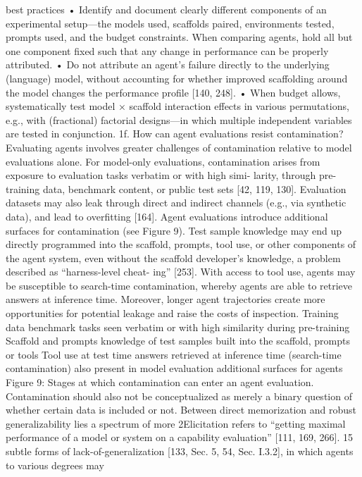 best practices
• Identify and document clearly different components of an experimental setup—the models used, scaffolds
paired, environments tested, prompts used, and the budget constraints. When comparing agents, hold all
but one component fixed such that any change in performance can be properly attributed.
• Do not attribute an agent’s failure directly to the underlying (language) model, without accounting for
whether improved scaffolding around the model changes the performance profile [140, 248].
• When budget allows, systematically test model × scaffold interaction effects in various permutations, e.g.,
with (fractional) factorial designs—in which multiple independent variables are tested in conjunction.
1f. How can agent evaluations resist contamination?
Evaluating agents involves greater challenges of contamination relative to model evaluations alone. For
model-only evaluations, contamination arises from exposure to evaluation tasks verbatim or with high simi-
larity, through pre-training data, benchmark content, or public test sets [42, 119, 130]. Evaluation datasets
may also leak through direct and indirect channels (e.g., via synthetic data), and lead to overfitting [164].
Agent evaluations introduce additional surfaces for contamination (see Figure 9). Test sample knowledge
may end up directly programmed into the scaffold, prompts, tool use, or other components of the agent
system, even without the scaffold developer’s knowledge, a problem described as “harness-level cheat-
ing” [253]. With access to tool use, agents may be susceptible to search-time contamination, whereby agents
are able to retrieve answers at inference time. Moreover, longer agent trajectories create more opportunities
for potential leakage and raise the costs of inspection.
Training data
benchmark tasks seen
verbatim or with high
similarity during pre-training
Scaffold and prompts
knowledge of test samples
built into the scaffold,
prompts or tools
Tool use at test time
answers retrieved at inference
time (search-time
contamination)
also present in model evaluation
additional surfaces for agents
Figure 9: Stages at which contamination can enter an agent evaluation.
Contamination should also not be conceptualized as merely a binary question of whether certain data
is included or not. Between direct memorization and robust generalizability lies a spectrum of more
2Elicitation refers to “getting maximal performance of a model or system on a capability evaluation” [111, 169, 266].
15
subtle forms of lack-of-generalization [133, Sec. 5, 54, Sec. I.3.2], in which agents to various degrees may
